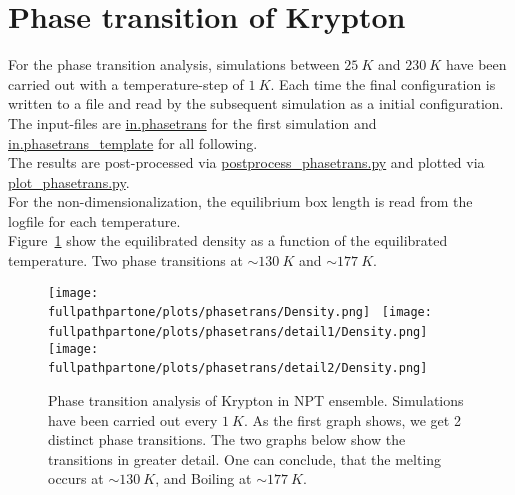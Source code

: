 \documentclass[10pt,a4paper]{report}
\def \pathpartone {../../1_three-dimensional_atomic_system}
\def \fullpathpartone {/home/lukas/Desktop/project/independence/atomistic_modeling/exam/1_three-dimensional_atomic_system}
\begin{document}
\section{Phase transition of Krypton}


For the phase transition analysis, simulations between $25~K$ and $230~K$ have been carried out with a temperature-step of $1~K$. Each time the final configuration is written to a file and read by the subsequent simulation as a initial configuration.\\
The input-files are \href{\pathpartone/in.phasetrans}{in.phasetrans} for the first simulation and \href{\pathpartone/in.phasetrans_template}{in.phasetrans\_template} for all following.\\
The results are post-processed via \href{\pathpartone/postprocess_phasetrans.py}{postprocess\_phasetrans.py} and plotted via \href{\pathpartone/plot_phasetrans.py}{plot\_phasetrans.py}.\\
For the non-dimensionalization, the equilibrium box length is read from the logfile for each temperature.\\
Figure~\ref{fig:p1_phasetransition_dens} show the equilibrated density as a function of the equilibrated temperature. Two phase transitions at $\sim130~K$ and $\sim177~K$. 



\begin{center}
\begin{figure}[h]
\texttt{[image: \\fullpathpartone/plots/phasetrans/Density.png]}~
\texttt{[image: \\fullpathpartone/plots/phasetrans/detail1/Density.png]}~
\texttt{[image: \\fullpathpartone/plots/phasetrans/detail2/Density.png]}~
\caption[aaa]{Phase transition analysis of Krypton in NPT ensemble. Simulations have been carried out every $1~K$. As the first graph shows, we get 2 distinct phase transitions. The two graphs below show the transitions in greater detail. One can conclude, that the melting occurs at $\sim130~K$, and Boiling at $\sim177~K$.}
\label{fig:p1_phasetransition_dens}
\end{figure}
\end{center}
\end{document}
